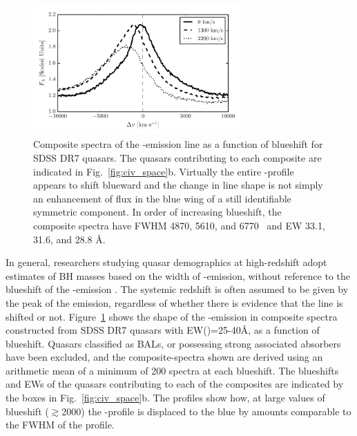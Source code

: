 \begin{figure}
    \includegraphics[width=8cm]{figures/chapter02/civ_composites.pdf}
    \caption{Composite spectra of the -emission line as a function of  blueshift for SDSS DR7 quasars. The quasars contributing to each composite are indicated in Fig.~\ref{fig:civ_space}b. Virtually the entire -profile appears to shift blueward and the change in line shape is not simply an enhancement of flux in the blue wing of a still identifiable symmetric component. In order of increasing  blueshift, the composite spectra have FWHM 4870, 5610, and 6770 \kms\, and EW 33.1, 31.6, and 28.8 \AA.}
    \label{fig:civ_composites}
\end{figure}

In general, researchers studying quasar demographics at high-redshift adopt estimates of BH masses based on the width of -emission, without reference to the blueshift of the -emission \citep[e.g.][]{vestergaard04,kollmeier06,gavignaud08,vestergaard08,vestergaard09,kelly10,kelly13}.  
The systemic redshift is often assumed to be given by the peak of the  emission, regardless of whether there is evidence that the line is shifted or not.
Figure~\ref{fig:civ_composites} shows the shape of the -emission in composite spectra constructed from SDSS DR7 quasars with EW()=25-40\AA, as a function of  blueshift. 
Quasars classified as BALs, or possessing strong associated absorbers have been excluded, and the composite-spectra shown are derived using an arithmetic mean of a minimum of 200 spectra at each blueshift. 
The blueshifts and EWs of the quasars contributing to each of the composites are indicated by the boxes in Fig.~\ref{fig:civ_space}b.  
The profiles show how, at large values of blueshift ($\gtrsim$2000\kms) the -profile is displaced to the blue by amounts comparable to the FWHM of the profile.

